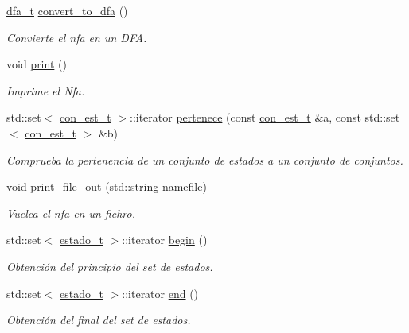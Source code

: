 \begin{DoxyCompactItemize}
\hyperlink{classdfa__t}{dfa\+\_\+t} \hyperlink{classnfa__t_a299fb32d9a64a117fd770b7b80ccf1cb}{convert\+\_\+to\+\_\+dfa} ()
\begin{DoxyCompactList}\small\item\em Convierte el nfa en un D\+FA. \end{DoxyCompactList}\item 
\mbox{\label{classnfa__t_af877ed128f31ebaea63054e5a54f7a61}} 
void \hyperlink{classnfa__t_af877ed128f31ebaea63054e5a54f7a61}{print} ()
\begin{DoxyCompactList}\small\item\em Imprime el Nfa. \end{DoxyCompactList}\item 
std\+::set$<$ \hyperlink{classcon__est__t}{con\+\_\+est\+\_\+t} $>$\+::iterator \hyperlink{classnfa__t_a5095044b6e4ad903c079254cb6db86ee}{pertenece} (const \hyperlink{classcon__est__t}{con\+\_\+est\+\_\+t} \&a, const std\+::set$<$ \hyperlink{classcon__est__t}{con\+\_\+est\+\_\+t} $>$ \&b)
\begin{DoxyCompactList}\small\item\em Comprueba la pertenencia de un conjunto de estados a un conjunto de conjuntos. \end{DoxyCompactList}\item 
\mbox{\label{classnfa__t_aab67377ddcae9ef01f5a520567bd2829}} 
void \hyperlink{classnfa__t_aab67377ddcae9ef01f5a520567bd2829}{print\+\_\+file\+\_\+out} (std\+::string namefile)
\begin{DoxyCompactList}\small\item\em Vuelca el nfa en un fichro. \end{DoxyCompactList}\item 
std\+::set$<$ \hyperlink{classestado__t}{estado\+\_\+t} $>$\+::iterator \hyperlink{classnfa__t_a60b8e4a7aab7e52c68dae1c4373f6b13}{begin} ()
\begin{DoxyCompactList}\small\item\em Obtención del principio del set de estados. \end{DoxyCompactList}\item 
std\+::set$<$ \hyperlink{classestado__t}{estado\+\_\+t} $>$\+::iterator \hyperlink{classnfa__t_abaa08ab9e3a46ee1eea80e108cd5a01c}{end} ()
\begin{DoxyCompactList}\small\item\em Obtención del final del set de estados. \end{DoxyCompactList}\item 

\end{DoxyCompactItemize}
